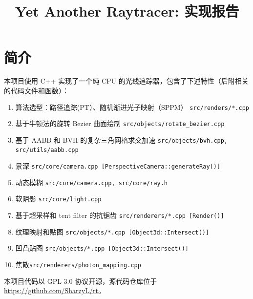 \documentclass[cn]{report}
\let\t\texttt
\begin{document}
    \title{Yet Another Raytracer: 实现报告}
    \author{}
    \date{}
    \maketitle
    \tableofcontents
    \newpage

    \section{简介}
    本项目使用 C++ 实现了一个纯 CPU 的光线追踪器，包含了下述特性（后附相关的代码文件和函数）：

    \begin{enumerate}
        \item 算法选型：路径追踪(PT）、随机渐进光子映射（SPPM） \hfill\t{src/renders/*.cpp}
        \item 基于牛顿法的旋转 Bezier 曲面绘制 \hfill\t{src/objects/rotate\_bezier.cpp}
        \item 基于 AABB 和 BVH 的复杂三角网格求交加速 \hfill\t{src/objects/bvh.cpp, src/utils/aabb.cpp}
        \item 景深 \hfill\t{src/core/camera.cpp [PerspectiveCamera::generateRay()]}
        \item 动态模糊 \hfill\t{src/core/camera.cpp, src/core/ray.h}
        \item 软阴影 \hfill\t{src/core/light.cpp}
        \item 基于超采样和 tent filter 的抗锯齿 \hfill\t{src/renderers/*.cpp [Render()]}
        \item 纹理映射和贴图 \hfill \t{src/objects/*.cpp [Object3d::Intersect()]}
        \item 凹凸贴图 \hfill \t{src/objects/*.cpp [Object3d::Intersect()]}
        \item 焦散\hfill \t{src/renderers/photon\_mapping.cpp}
    \end{enumerate}

    本项目代码以 GPL 3.0 协议开源，源代码仓库位于 \url{https://github.com/SharzyL/rt}。

\end{document}
